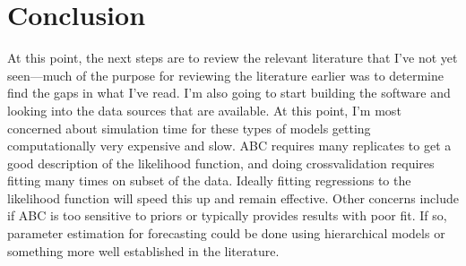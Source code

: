 \documentclass[]{article}
\begin{document}
\hypertarget{conclusion}{%
\section{Conclusion}\label{conclusion}}

At this point, the next steps are to review the relevant literature that I've not yet seen---much of the purpose for reviewing the literature earlier was to determine find the gaps in what I've read. I'm also going to start building the software and looking into the data sources that are available. At this point, I'm most concerned about simulation time for these types of models getting computationally very expensive and slow. ABC requires many replicates to get a good description of the likelihood function, and doing crossvalidation requires fitting many times on subset of the data. Ideally fitting regressions to the likelihood function will speed this up and remain effective. Other concerns include if ABC is too sensitive to priors or typically provides results with poor fit. If so, parameter estimation for forecasting could be done using hierarchical models or something more well established in the literature.

%
%
%
\clearpage
{
\footnotesize

}
\end{document}
